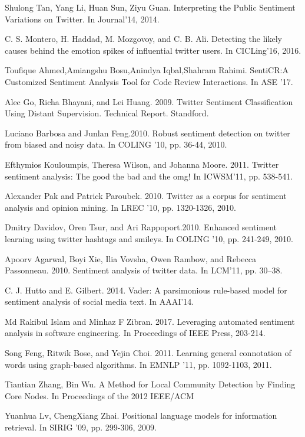 \documentclass[runningheads]{llncs}
\begin{document}
\begin{thebibliography}{8}
Shulong Tan, Yang Li, Huan Sun, Ziyu Guan.
\newblock Interpreting the Public Sentiment Variations on Twitter. 
\newblock In Journal’14, 2014.

C. S. Montero, H. Haddad, M. Mozgovoy, and C. B. Ali.
\newblock Detecting the likely causes behind the emotion spikes of influential twitter users. 
\newblock In CICLing’16, 2016.

Toufique Ahmed,Amiangshu Bosu,Anindya Iqbal,Shahram Rahimi.
\newblock SentiCR:A Customized Sentiment Analysis Tool for Code Review Interactions.
\newblock In ASE ’17.

Alec Go, Richa Bhayani, and Lei Huang. 2009.
\newblock Twitter Sentiment Classification Using Distant Supervision.
\newblock Technical Report. Standford.

Luciano Barbosa and Junlan Feng.2010.
\newblock Robust sentiment detection on twitter from biased and noisy data.
\newblock In COLING ’10, pp. 36-44, 2010.

Efthymios Kouloumpis, Theresa Wilson, and Johanna Moore. 2011.
\newblock Twitter sentiment analysis: The good the bad and the omg!
\newblock In ICWSM’11, pp. 538-541.

Alexander Pak and Patrick Paroubek. 2010.
\newblock Twitter as a corpus for sentiment analysis and opinion mining.
\newblock In LREC ’10, pp. 1320-1326, 2010.

Dmitry Davidov, Oren Tsur, and Ari Rappoport.2010.
\newblock Enhanced sentiment learning using twitter hashtags and smileys.
\newblock In COLING ’10, pp. 241-249, 2010.

Apoorv Agarwal, Boyi Xie, Ilia Vovsha, Owen Rambow, and Rebecca Passonneau. 2010.
\newblock Sentiment analysis of twitter data.
\newblock In LCM’11, pp. 30–38.

C. J. Hutto and E. Gilbert. 2014.
\newblock Vader: A parsimonious rule-based model for sentiment analysis of social media text.
\newblock In AAAI’14.

Md Rakibul Islam and Minhaz F Zibran. 2017.
\newblock Leveraging automated sentiment analysis in software engineering. 
\newblock In Proceedings of IEEE Press, 203-214.

Song Feng, Ritwik Bose, and Yejin Choi. 2011.
\newblock Learning general connotation of words using graph-based algorithms.
\newblock In EMNLP ’11, pp. 1092-1103, 2011.

Tiantian Zhang, Bin Wu.
\newblock A Method for Local Community Detection by Finding Core Nodes. \newblock In Proceedings of the 2012 IEEE/ACM 

Yuanhua Lv, ChengXiang Zhai.
\newblock Positional language models for information retrieval.
\newblock In SIRIG ’09, pp. 299-306, 2009.


\end{thebibliography}
\end{document}
